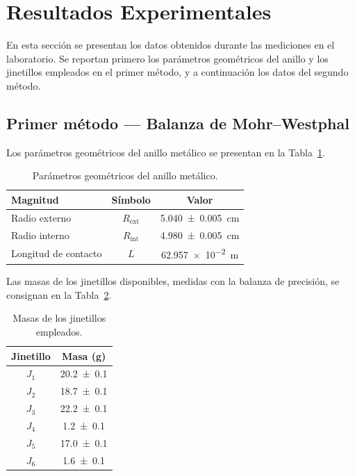 
\section{Resultados Experimentales}
\label{sec:resultados}

En esta sección se presentan los datos obtenidos durante las mediciones
en el laboratorio. Se reportan primero los parámetros geométricos del
anillo y los jinetillos empleados en el primer método, y a continuación
los datos del segundo método.

\subsection{Primer método --- Balanza de Mohr--Westphal}

Los parámetros geométricos del anillo metálico se presentan en la
Tabla~\ref{tab:param_anillo}.

\begin{table}[H]
    \centering
    \caption{Parámetros geométricos del anillo metálico.}
    \label{tab:param_anillo}
    \begin{tabular}{lcc}
        \toprule
        \textbf{Magnitud} & \textbf{Símbolo} & \textbf{Valor} \\
        \midrule
        Radio externo        & $R_{\text{ext}}$ & \qty{5.040 \pm 0.005}{\centi\meter} \\
        Radio interno        & $R_{\text{int}}$ & \qty{4.980 \pm 0.005}{\centi\meter} \\
        Longitud de contacto & $L$              & \qty{62.957e-2}{\meter}           \\
        \bottomrule
    \end{tabular}
\end{table}

Las masas de los jinetillos disponibles, medidas con la balanza de
precisión, se consignan en la Tabla~\ref{tab:jinetillos}.

\begin{table}[H]
    \centering
    \caption{Masas de los jinetillos empleados.}
    \label{tab:jinetillos}
    \begin{tabular}{cc}
        \toprule
        \textbf{Jinetillo} & \textbf{Masa (g)} \\
        \midrule
        $J_1$ & \num{20.2 \pm 0.1} \\
        $J_2$ & \num{18.7 \pm 0.1} \\
        $J_3$ & \num{22.2 \pm 0.1} \\
        $J_4$ & \num{1.2 \pm 0.1}  \\
        $J_5$ & \num{17.0 \pm 0.1} \\
        $J_6$ & \num{1.6 \pm 0.1}  \\
        \bottomrule
    \end{tabular}
\end{table}

